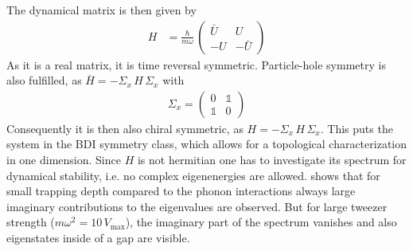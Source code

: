 The dynamical matrix is then given by
\begin{align*}
   {H} &= \frac{\hbar}{m\omega}\,\begin{pmatrix}
       \bar{U} & U \\
       -U & -\bar{U}
       \end{pmatrix}
\end{align*}
As it is a real matrix, it is time reversal symmetric. Particle-hole symmetry is also fulfilled, as $ \overline{H}=-\Sigma_x\, H \,\Sigma_x$ with 
\begin{align*}\Sigma_x=\begin{pmatrix}
    0 & \mathbb{1}\\
    \mathbb{1} & 0
\end{pmatrix}\end{align*}
Consequently it is then also chiral symmetric, as $ H =-\Sigma_x\, H \,\Sigma_x$. This puts the system in the BDI symmetry class, which allows for a topological characterization in one dimension. 
Since $H$ is not hermitian one has to investigate its spectrum for dynamical stability, i.e. no complex eigenenergies are allowed.  shows that for small trapping depth compared to the phonon interactions always large imaginary contributions to the eigenvalues are observed. But for large tweezer strength ($m\omega^2=10\,V_\text{max}$), the imaginary part of the spectrum vanishes and also eigenstates inside of a gap are visible. %
